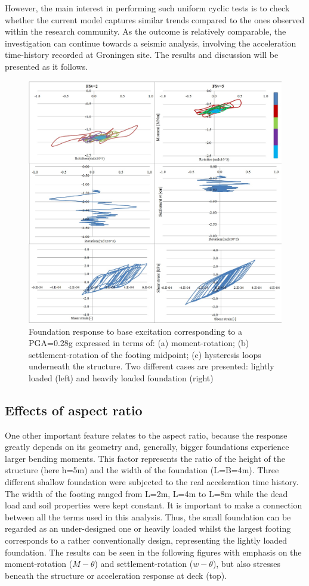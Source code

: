  However, the main interest in performing such uniform cyclic tests is to check whether the current model captures similar trends compared to the ones observed within the research community. As the outcome is relatively comparable, the investigation can continue towards a seismic analysis, involving the acceleration time-history recorded at Groningen site. The results and discussion will be presented as it follows.
 
 \begin{figure}[!h]
 	\centering
 	\includegraphics[width=0.9\linewidth]{"eq_fs5-24m"}
 	\caption{Foundation response to base excitation corresponding to a PGA=0.28g expressed in terms of: (a) moment-rotation; (b) settlement-rotation of the footing midpoint; (c) hysteresis loops underneath the structure. Two different cases are presented: lightly loaded (left) and heavily loaded foundation (right)}
 	\label{eq1}
 \end{figure}
 \pagebreak
 
\newpage
\subsection{Effects of aspect ratio}
One other important feature relates to the aspect ratio, because the response greatly depends on its geometry and, generally, bigger foundations experience larger bending moments. This factor represents the ratio of the height of the structure (here h=5m) and the width of the foundation (L=B=4m). Three different shallow foundation were subjected to the real acceleration time history. The width of the footing ranged from L=2m, L=4m to L=8m while the dead load and soil properties were kept constant. It is important to make a connection between all the terms used in this analysis. Thus, the small foundation can be regarded as an under-designed one or heavily loaded whilst the largest footing corresponds to a rather conventionally design, representing the lightly loaded foundation. The results can be seen in the following figures with emphasis on the moment-rotation ($M-\theta$) and settlement-rotation ($w-\theta$), but also stresses beneath the structure or acceleration response at deck (top).


